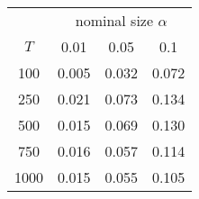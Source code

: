 % 
\begin{tabular}{cccc}
  \hline
  & \multicolumn{3}{c}{nominal size $\alpha$} \\
 $T$ & 0.01 & 0.05 & 0.1 \\
 \hline
100 & 0.005 & 0.032 & 0.072 \\ 
  250 & 0.021 & 0.073 & 0.134 \\ 
  500 & 0.015 & 0.069 & 0.130 \\ 
  750 & 0.016 & 0.057 & 0.114 \\ 
  1000 & 0.015 & 0.055 & 0.105 \\ 
   \hline
\end{tabular}
